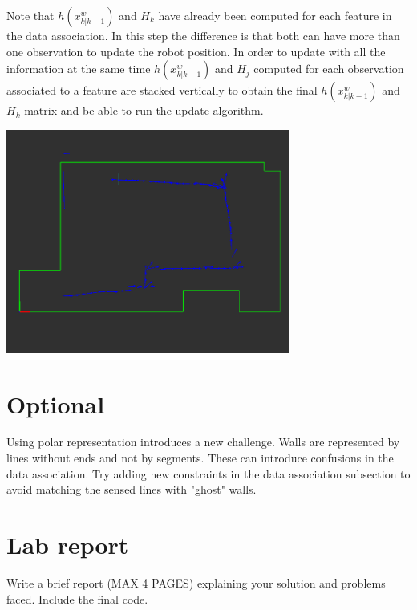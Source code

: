 \documentclass[a4paper,10pt]{article}
\begin{document}
Note that $h(x_{k|k-1}^w)$ and $H_k$ have already been computed for each feature in the data association. In this step the difference is that both can have more than one observation to update the robot position. In order to update with all the information at the same time $h(x_{k|k-1}^w)$ and $H_j$ computed for each observation associated to a feature are stacked vertically to obtain the final $h(x_{k|k-1}^w)$ and $H_k$ matrix and be able to run the update algorithm.

\begin{center}
	\includegraphics[width=0.70\textwidth]{pict/updates.png}
	\label{updates}
\end{center}

\section{Optional}

Using polar representation introduces a new challenge. Walls are represented by lines without ends and not by segments. These can introduce confusions in the data association. Try adding new constraints in the data association subsection to avoid matching the sensed lines with "ghost" walls.

\section{Lab report}

Write a brief report (MAX 4 PAGES) explaining your solution and problems faced. Include the final code.
\end{document}
